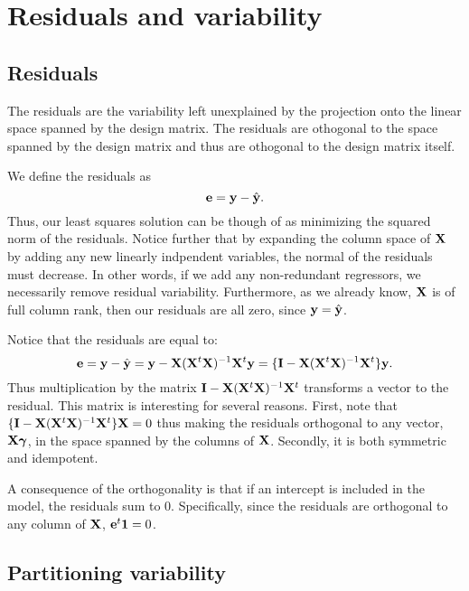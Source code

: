 \chapter{Residuals and variability}

\section{Residuals}
The residuals are the variability left unexplained by the projection 
onto the linear space spanned by the design matrix. The residuals
are othogonal to the space spanned by the design matrix and thus
are othogonal to the design matrix itself.

We define the residuals as
$$
\mathbf{e} = \mathbf{y} - \hat {\mathbf{y}}.
$$
Thus, our least squares solution can be though of as minimizing
the squared norm of the residuals. Notice further that by
expanding the column space of $\mathbf{X}$ by adding any new
linearly indpendent variables, the normal of the residuals
must decrease. In other words, if we add any non-redundant
regressors, we necessarily remove residual variability. Furthermore,
as we already know, $\mathbf{X}$ is of full column rank, then our residuals
are all zero, since $\mathbf{y} = \hat {\mathbf{y}}$. 

 Notice that the residuals are equal to:
$$
\mathbf{e} = \mathbf{y} - \hat {\mathbf{y}} = \mathbf{y} - \mathbf{X} (\mathbf{X}^t \mathbf{X})^{-1} \mathbf{X}^t \mathbf{y} = \{\mathbf{I} - \mathbf{X} (\mathbf{X}^t \mathbf{X})^{-1} \mathbf{X}^t\} \mathbf{y}.
$$
Thus multiplication by the matrix $\mathbf{I} - \mathbf{X} (\mathbf{X}^t \mathbf{X})^{-1} \mathbf{X}^t$ transforms a
vector to the residual. This matrix is interesting for several reasons.
First, note that $\{\mathbf{I} - \mathbf{X} (\mathbf{X}^t \mathbf{X})^{-1} \mathbf{X}^t\} \mathbf{X} = 0$ thus making the residuals
orthogonal to any vector, $\mathbf{X} \boldsymbol{\gamma}$, in the space spanned by the
columns of $\mathbf{X}$. Secondly, it is both symmetric and idempotent. 

A consequence of the orthogonality is that if an intercept is
included in the model, the residuals sum to 0. Specifically,
since the residuals are orthogonal to any column of $\mathbf{X}$, 
$\mathbf{e}^t \mathbf{1} = 0$.

\section{Partitioning variability}

